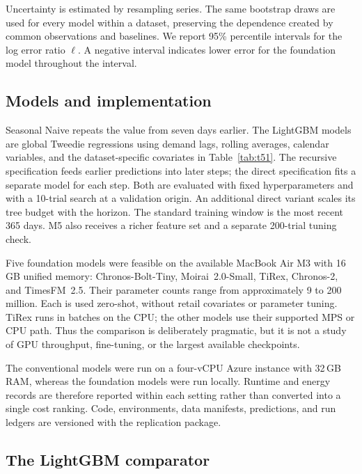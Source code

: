 Uncertainty is estimated by resampling series. The same bootstrap draws are
used for every model within a dataset, preserving the dependence created by
common observations and baselines. We report 95\% percentile intervals for
the log error ratio $\ell$. A negative interval indicates lower error for the
foundation model throughout the interval.

\subsection{Models and implementation}
\label{sec:modelfamilies}\label{sec:fm}\label{sec:fm_scope}
\label{sec:fm_extraction}\label{sec:fm_local}\label{sec:fm-consumer-box}

Seasonal Naive repeats the value from seven days earlier. The LightGBM models
are global Tweedie regressions using demand lags, rolling averages, calendar
variables, and the dataset-specific covariates in Table~\ref{tab:t51}. The
recursive specification feeds earlier predictions into later steps; the
direct specification fits a separate model for each step. Both are evaluated
with fixed hyperparameters and with a 10-trial search at a validation origin.
An additional direct variant scales its tree budget with the horizon. The
standard training window is the most recent 365 days. M5 also receives a
richer feature set and a separate 200-trial tuning check.

Five foundation models were feasible on the available MacBook Air M3 with
16\,GB unified memory: Chronos-Bolt-Tiny, Moirai~2.0-Small, TiRex, Chronos-2,
and TimesFM~2.5. Their parameter counts range from approximately 9 to 200
million. Each is used zero-shot, without retail covariates or parameter
tuning. TiRex runs in batches on the CPU; the other models use their supported
MPS or CPU path. Thus the comparison is deliberately pragmatic, but it is not
a study of GPU throughput, fine-tuning, or the largest available checkpoints.

The conventional models were run on a four-vCPU Azure instance with 32\,GB
RAM, whereas the foundation models were run locally. Runtime and energy
records are therefore reported within each setting rather than converted into
a single cost ranking. Code, environments, data manifests, predictions, and
run ledgers are versioned with the replication package.
\label{sec:compute}\label{sec:reproducibility}\label{sec:fm_repro}

\subsection{The LightGBM comparator}
\label{sec:results}\label{sec:crossdataset}\label{sec:perdataset}
\label{sec:baseline}\label{sec:baseline-reliability}
\label{sec:m5results}\label{sec:dirvsr}\label{sec:m5distance}
\label{sec:rohlik}\label{sec:favorita}\label{sec:synthesis}
\label{sec:threats}\label{sec:costconsequences}\label{sec:takeaways}

